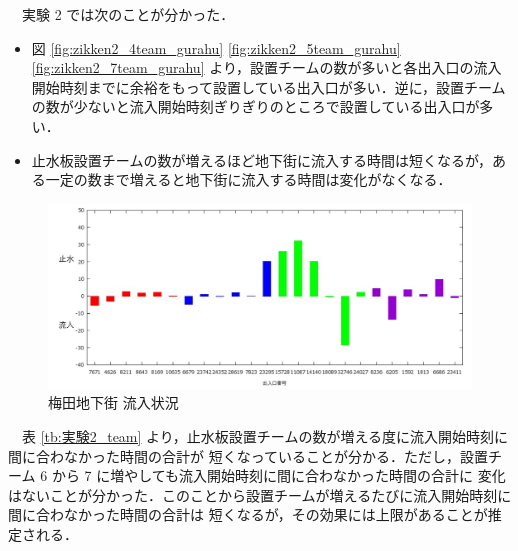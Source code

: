 \documentclass[a4paper,10pt]{jarticle}
\begin{document}
　実験 2 では次のことが分かった．
\begin{itemize}
\item 図 \ref{fig:zikken2_4team_gurahu} \ref{fig:zikken2_5team_gurahu} \ref{fig:zikken2_7team_gurahu} より，設置チームの数が多いと各出入口の流入開始時刻までに余裕をもって設置している出入口が多い．逆に，設置チームの数が少ないと流入開始時刻ぎりぎりのところで設置している出入口が多い．
  \vspace{-2mm}
\item 止水板設置チームの数が増えるほど地下街に流入する時間は短くなるが，ある一定の数まで増えると地下街に流入する時間は変化がなくなる．
\end{itemize}

\begin{figure}[H]
\centering
\includegraphics[scale=0.25]{zikken2_4team_gurahu.pdf}
\caption{梅田地下街 流入状況 }
\vspace{-2mm}
\label{fig:zikken2_4team_gurahu.pdf}
\end{figure}
\vspace{-5mm}
　表 \ref{tb:実験2_team} より，止水板設置チームの数が増える度に流入開始時刻に間に合わなかった時間の合計が
    短くなっていることが分かる．ただし，設置チーム 6 から 7 に増やしても流入開始時刻に間に合わなかった時間の合計に
    変化はないことが分かった．このことから設置チームが増えるたびに流入開始時刻に間に合わなかった時間の合計は
    短くなるが，その効果には上限があることが推定される．
    \vspace{-5mm}
\vspace{-4mm}
\end{document}
